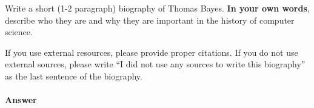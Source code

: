 \documentclass{article}
\begin{document}
\collab{\todo{}}

Write a short (1-2 paragraph) biography of Thomas Bayes.
\textbf{In your own words}, describe who they are and why they are important in
the history of computer science.

If you use external resources, please provide
proper citations. If you do not use external sources, please write ``I did not
use any sources to write this biography'' as the last sentence of the
biography.

\paragraph{Answer}


% 
% 
\end{document}
